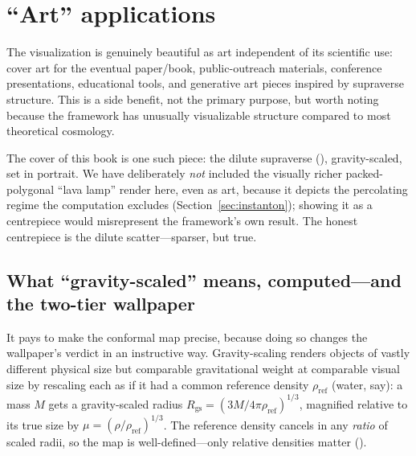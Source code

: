 \section{``Art'' applications}

The visualization is genuinely beautiful as art independent of its scientific
use: cover art for the eventual paper/book, public-outreach materials, conference
presentations, educational tools, and generative art pieces inspired by
supraverse structure. This is a side benefit, not the primary purpose, but worth
noting because the framework has unusually visualizable structure compared to
most theoretical cosmology.

The cover of this book is one such piece: the dilute supraverse
(), gravity-scaled, set in portrait. We have deliberately
\emph{not} included the visually richer packed-polygonal ``lava lamp'' render here,
even as art, because it depicts the percolating regime the computation excludes
(Section~\ref{sec:instanton}); showing it as a centrepiece would misrepresent the
framework's own result. The honest centrepiece is the dilute scatter---sparser, but
true.

\subsection{What ``gravity-scaled'' means, computed---and the two-tier wallpaper}
\label{sec:gravity-scaled}

It pays to make the conformal map precise, because doing so changes the wallpaper's
verdict in an instructive way. Gravity-scaling renders objects of vastly different
physical size but comparable gravitational weight at comparable visual size by
rescaling each as if it had a common reference density $\rho_{\mathrm{ref}}$ (water,
say): a mass $M$ gets a gravity-scaled radius $R_{\mathrm{gs}}=(3M/4\pi
\rho_{\mathrm{ref}})^{1/3}$, magnified relative to its true size by
$\mu=(\rho/\rho_{\mathrm{ref}})^{1/3}$. The reference density cancels in any \emph{ratio}
of scaled radii, so the map is well-defined---only relative densities matter
().

